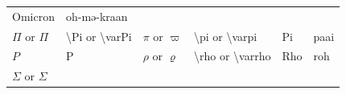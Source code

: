 \documentclass[
]{book}
\begin{document}
\begin{longtable}[]{@{}llllll@{}}
\begin{minipage}[t]{0.06\columnwidth}
Omicron\strut
\end{minipage} & \begin{minipage}[t]{0.08\columnwidth}\raggedright
oh-mə-kraan\strut
\end{minipage}\tabularnewline
\begin{minipage}[t]{0.18\columnwidth}\raggedright
\(\Pi\) or \(\varPi\)\strut
\end{minipage} & \begin{minipage}[t]{0.17\columnwidth}\raggedright
\textbackslash Pi or \textbackslash varPi\strut
\end{minipage} & \begin{minipage}[t]{0.18\columnwidth}\raggedright
\(\pi\) or \(\varpi\)\strut
\end{minipage} & \begin{minipage}[t]{0.17\columnwidth}\raggedright
\textbackslash pi or \textbackslash varpi\strut
\end{minipage} & \begin{minipage}[t]{0.06\columnwidth}\raggedright
Pi\strut
\end{minipage} & \begin{minipage}[t]{0.08\columnwidth}\raggedright
paai\strut
\end{minipage}\tabularnewline
\begin{minipage}[t]{0.18\columnwidth}\raggedright
\(P\)\strut
\end{minipage} & \begin{minipage}[t]{0.17\columnwidth}\raggedright
P\strut
\end{minipage} & \begin{minipage}[t]{0.18\columnwidth}\raggedright
\(\rho\) or \(\varrho\)\strut
\end{minipage} & \begin{minipage}[t]{0.17\columnwidth}\raggedright
\textbackslash rho or \textbackslash varrho\strut
\end{minipage} & \begin{minipage}[t]{0.06\columnwidth}\raggedright
Rho\strut
\end{minipage} & \begin{minipage}[t]{0.08\columnwidth}\raggedright
roh\strut
\end{minipage}\tabularnewline
\begin{minipage}[t]{0.18\columnwidth}\raggedright
\(\Sigma\) or \(\varSigma\)\strut
\end{minipage} & \begin{minipage}[t]{0.17\columnwidth}\raggedright

\end{minipage}
\end{longtable}
\end{document}
